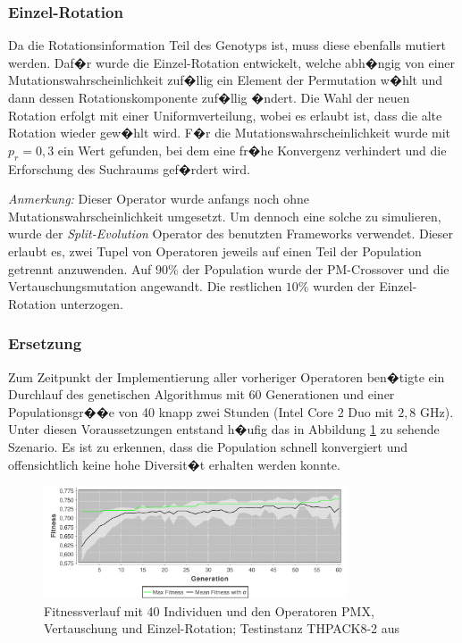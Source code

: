 \documentclass[a4paper,abstracton,12pt]{scrartcl}
\begin{document}
\subsubsection{Einzel-Rotation}

Da die Rotationsinformation Teil des Genotyps ist, muss diese ebenfalls mutiert werden. Daf�r wurde die Einzel-Rotation entwickelt, welche abh�ngig von einer Mutationswahrscheinlichkeit zuf�llig ein Element der Permutation w�hlt und dann dessen Rotationskomponente zuf�llig �ndert. Die Wahl der neuen Rotation erfolgt mit einer Uniformverteilung, wobei es erlaubt ist, dass die alte Rotation wieder gew�hlt wird. F�r die Mutationswahrscheinlichkeit wurde mit $p_r = 0,3$ ein Wert gefunden, bei dem eine fr�he Konvergenz verhindert und die Erforschung des Suchraums gef�rdert wird.

\emph{Anmerkung:} Dieser Operator wurde anfangs noch ohne Mutationswahrscheinlichkeit umgesetzt. Um dennoch eine solche zu simulieren, wurde der \emph{Split-Evolution} Operator des benutzten Frameworks verwendet. Dieser erlaubt es, zwei Tupel von Operatoren jeweils auf einen Teil der Population getrennt anzuwenden. Auf $90\%$ der Population wurde der PM-Crossover und die Vertauschungsmutation angewandt. Die restlichen $10\%$ wurden der Einzel-Rotation unterzogen.

\subsubsection{Ersetzung}

Zum Zeitpunkt der Implementierung aller vorheriger Operatoren ben�tigte ein Durchlauf des genetischen Algorithmus mit 60 Generationen und einer Populationsgr��e von 40 knapp zwei Stunden (Intel Core 2 Duo mit $2,8$ GHz). Unter diesen Voraussetzungen entstand h�ufig das in Abbildung \ref{fig:thpack8-2_pmx,listmutation,rotation,pop40} zu sehende Szenario. Es ist zu erkennen, dass die Population schnell konvergiert und offensichtlich keine hohe Diversit�t erhalten werden konnte.

\begin{figure}
	\centering
		\includegraphics[width=0.80\textwidth]{imgs/thpack8-2_pmx,listmutation,rotation,pop40.pdf}
	\caption{Fitnessverlauf mit 40 Individuen und den Operatoren PMX, Vertauschung und Einzel-Rotation; Testinstanz THPACK8-2 aus \cite{packlib2}}
	\label{fig:thpack8-2_pmx,listmutation,rotation,pop40}
\end{figure}
\end{document}
